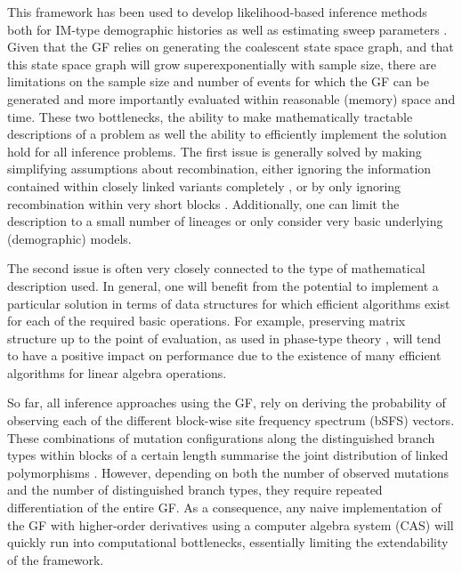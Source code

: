 \documentclass[10pt, a4]{article}
\begin{document}
This framework has been used to develop likelihood-based inference methods both for IM-type demographic histories \citep{Lohse2011, Bunnefeld2015, Lohse2016} as well as estimating sweep parameters \citep{Bisschop2021}. Given that the GF relies on generating the coalescent state space graph, and that this state space graph will grow superexponentially with sample size, there are limitations on the sample size and number of events for which the GF can be generated and more importantly evaluated within reasonable (memory) space and time. These two bottlenecks, the ability to make mathematically tractable descriptions of a problem as well the ability to efficiently implement the solution hold for all inference problems. The first issue is generally solved by making simplifying assumptions about recombination, either ignoring the information contained within closely linked variants completely \citep{Gutenkunst2009, Excoffier2013}, or by only ignoring recombination within very short blocks \citep{Yang2002, Hey2004}. Additionally, one can limit the description to a small number of lineages or only consider very basic underlying (demographic) models.

The second issue is often very closely connected to the type of mathematical description used. In general, one will benefit from the potential to implement a particular solution in terms of data structures for which efficient algorithms exist for each of the required basic operations. For example, preserving matrix structure up to the point of evaluation, as used in phase-type theory \citep{Hobolth2019}, will tend to have a positive impact on performance due to the existence of many efficient algorithms for linear algebra operations.

So far, all inference approaches using the GF, rely on deriving the probability of observing each of the different block-wise site frequency spectrum (bSFS) vectors. These combinations of mutation configurations along the distinguished branch types within blocks of a certain length summarise the joint distribution of linked polymorphisms \citep{Bunnefeld2015}. However, depending on both the number of observed mutations and the number of distinguished branch types, they require repeated differentiation of the entire GF. As a consequence, any naive implementation of the GF with higher-order derivatives using a computer algebra system (CAS) will quickly run into computational bottlenecks, essentially limiting the extendability of the framework.
\end{document}
